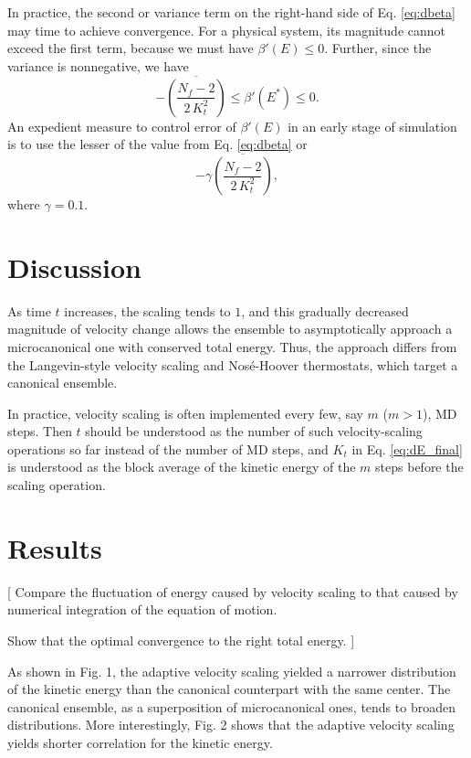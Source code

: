 \documentclass[reprint]{revtex4-1}
\begin{document}
In practice, the second or variance term on the right-hand side
of Eq. \eqref{eq:dbeta} may time to achieve convergence.
%
For a physical system, its magnitude cannot exceed
the first term, because we must have $\beta'(E) \le 0$.
%
Further, since the variance is nonnegative, we have
%
\begin{equation}
  - \overline{
    \left(
      \frac{ N_f - 2 }
           { 2 \, K_t^2 }
    \right)
    }
  \le
  \beta'(E^*)
  \le
  0.
\end{equation}
%
An expedient measure to control error of $\beta'(E)$
in an early stage of simulation
is to use the lesser of the value from Eq. \eqref{eq:dbeta}
or
%
\begin{equation*}
  -\gamma \overline{
    \left(
      \frac{ N_f - 2 }
           { 2 \, K_t^2 }
    \right)
    }
  ,
\end{equation*}
%
where $\gamma = 0.1$.



\section{Discussion}


As time $t$ increases, the scaling tends to $1$,
and this gradually decreased magnitude of velocity change
allows the ensemble to asymptotically approach a
microcanonical one with conserved total energy.
%
Thus, the approach differs from the Langevin-style
velocity scaling and Nos\'e-Hoover thermostats,
which target a canonical ensemble.


In practice, velocity scaling is often implemented every few,
say $m$ ($m > 1$), MD steps.
%
Then $t$ should be understood as the number of
such velocity-scaling operations so far instead of
the number of MD steps, and $K_t$ in Eq. \eqref{eq:dE_final} is understood
as the block average of the kinetic energy of the $m$ steps
before the scaling operation.


\section{Results}


[
Compare the fluctuation of energy caused by velocity scaling to
that caused by numerical integration of the equation of motion.


Show that the optimal convergence to the right total energy.
]

As shown in Fig. 1,
the adaptive velocity scaling yielded a narrower distribution
of the kinetic energy than the canonical counterpart
with the same center.
%
The canonical ensemble, as a superposition
of microcanonical ones,
tends to broaden distributions.
%
More interestingly,
Fig. 2 shows that the adaptive velocity scaling
yields shorter correlation for the kinetic energy.
\end{document}
